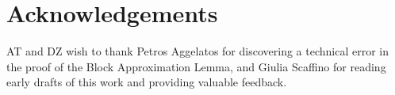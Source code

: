 \section{Acknowledgements}

AT and DZ wish to thank Petros Aggelatos for discovering a technical error in the
proof of the Block Approximation Lemma, and Giulia Scaffino for reading early drafts
of this work and providing valuable feedback.